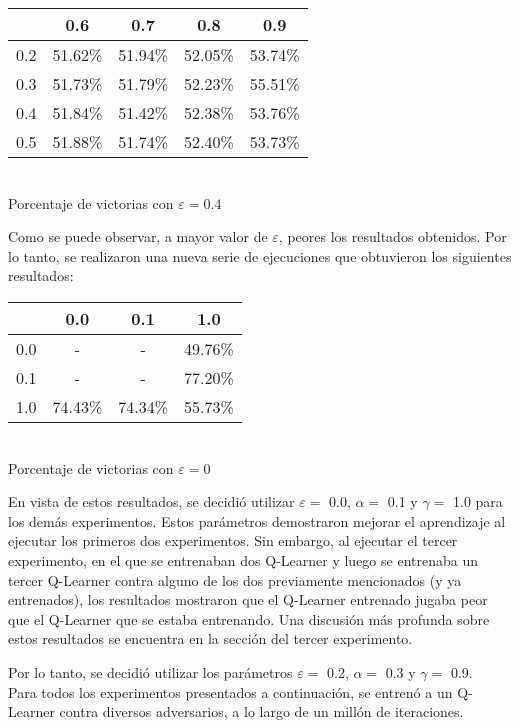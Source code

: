 \begin{center}
\begin{tabular}{|c||c|c|c|c|}
	\hline
	\backslashbox{$\alpha$}{$\gamma$} & 0.6 & 0.7 & 0.8 & 0.9\\
	\hline
	\hline
	0.2 & 51.62\% & 51.94\% & 52.05\% & 53.74\% \\
	\hline
	0.3 & 51.73\% & 51.79\% & 52.23\% & 55.51\% \\
	\hline
	0.4 & 51.84\% & 51.42\% & 52.38\% & \cellcolor{intvier}53.76\% \\
	\hline
	0.5 & 51.88\% & 51.74\% & 52.40\% & 53.73\% \\
	\hline
\end{tabular}\\
Porcentaje de victorias con $\varepsilon=0.4$
\end{center}

Como se puede observar, a mayor valor de $\varepsilon$, peores los resultados obtenidos. Por lo tanto, se realizaron una nueva serie de ejecuciones que obtuvieron los siguientes resultados:
\begin{center}
\begin{tabular}{|c||c|c|c|}
	\hline
	\backslashbox{$\alpha$}{$\gamma$} & 0.0 & 0.1 & 1.0\\
	\hline
	\hline
	0.0 & - & - & 49.76\%\\
	\hline
	0.1 & - & - & \cellcolor{intvier}77.20\%\\
	\hline
	1.0 & 74.43\% & 74.34\% & 55.73\%\\
	\hline
\end{tabular}\\
Porcentaje de victorias con $\varepsilon=0$
\end{center}

En vista de estos resultados, se decidi\'o utilizar $\varepsilon = $ 0.0, $\alpha = $ 0.1 y $\gamma = $ 1.0 para los dem\'as experimentos.
Estos parámetros demostraron mejorar el aprendizaje al ejecutar los primeros dos experimentos. Sin embargo, al ejecutar el tercer experimento, en el que se entrenaban dos Q-Learner y luego se entrenaba un tercer Q-Learner contra alguno de los dos previamente mencionados (y ya entrenados), los resultados mostraron que el Q-Learner entrenado jugaba peor que el Q-Learner que se estaba entrenando. Una discusión más profunda sobre estos resultados se encuentra en la sección del tercer experimento.

Por lo tanto, se decidió utilizar los parámetros $\varepsilon = $ 0.2, $\alpha = $ 0.3 y $\gamma = $ 0.9.\\

Para todos los experimentos presentados a continuación, se entrenó a un Q-Learner contra diversos adversarios, a lo largo de un millón de iteraciones.






